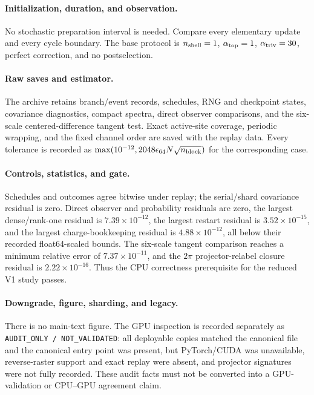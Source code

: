 \documentclass[aps,prx,twocolumn,floatfix,nofootinbib,superscriptaddress,longbibliography]{revtex4-2}
\newcommand{\code}[1]{\texttt{#1}}
\begin{document}
\paragraph*{Initialization, duration, and observation.}
No stochastic preparation interval is needed.  Compare every elementary update and every
cycle boundary.  The base protocol is $n_{\rm shell}=1$, $\alpha_{\rm top}=1$,
$\alpha_{\rm triv}=30$, perfect correction, and no postselection.

\paragraph*{Raw saves and estimator.}
The archive retains branch/event records, schedules, RNG and checkpoint states,
covariance diagnostics, compact spectra, direct observer comparisons, and the six-scale
centered-difference tangent test.  Exact active-site coverage, periodic wrapping, and the
fixed channel order are saved with the replay data.  Every tolerance is recorded as
$\max(10^{-12},2048\epsilon_{64}N\sqrt{n_{\rm block}})$ for the corresponding case.

\paragraph*{Controls, statistics, and gate.}
Schedules and outcomes agree bitwise under replay; the serial/shard covariance residual is
zero.  Direct observer and probability residuals are zero, the largest dense/rank-one
residual is $7.39\times10^{-12}$, the largest restart residual is
$3.52\times10^{-15}$, and the largest charge-bookkeeping residual is
$4.88\times10^{-12}$, all below their recorded float64-scaled bounds.  The six-scale
tangent comparison reaches a minimum relative error of $7.37\times10^{-11}$, and the
$2\pi$ projector-relabel closure residual is $2.22\times10^{-16}$.  Thus the CPU
correctness prerequisite for the reduced V1 study passes.

\paragraph*{Downgrade, figure, sharding, and legacy.}
There is no main-text figure.  The GPU inspection is recorded separately as
\code{AUDIT\_ONLY / NOT\_VALIDATED}: all deployable copies matched the canonical file and
the canonical entry point was present, but PyTorch/CUDA was unavailable, reverse-raster
support and exact replay were absent, and projector signatures were not fully recorded.
These audit facts must not be converted into a GPU-validation or CPU--GPU agreement claim.
\end{document}
